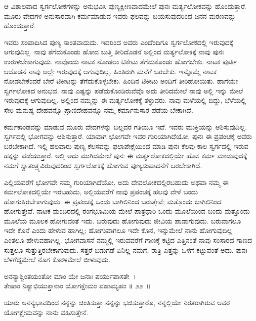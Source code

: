 \begin{artha}
ಆ ವಿಶಾಲವಾದ ಸ್ವರ್ಗಲೋಕಗಳನ್ನು ಅನುಭವಿಸಿ ಪುಣ್ಯಕ್ಷೀಣವಾದಮೇಲೆ ಪುನಃ ಮರ್ತ್ಯಲೋಕವನ್ನು ಹೊಂದುತ್ತಾರೆ. ಮೂರು ವೇದಗಳ ಅನುಸಾರವಾಗಿ ಕರ್ಮಮಾಡುವ ಇವರು ಫಲವನ್ನು ಬಯಸುವುದರಿಂದ ಜನನ ಮರಣವನ್ನು ಹೊಂದುತ್ತಾರೆ.
\end{artha}

ಇವರು ಸಂಪಾದಿಸಿದ ಪುಣ್ಯ ಸಾಂತವಾದುದು. ಇದರಿಂದ ಅವರು ಎಂದೆಂದಿಗೂ ಸ್ವರ್ಗ\-ಲೋಕದಲ್ಲಿ ಇರುವುದಕ್ಕೆ ಆಗುವುದಿಲ್ಲ. ನಾವು ತೆಗೆದುಕೊಂಡು ಹೋದ ಬುತ್ತಿ ತೀರಿದೊಡನೆ ಅಲ್ಲಿಂದ ಮರ್ತ್ಯಲೋಕಕ್ಕೆ ನಾವು ಪುನಃ ಉರುಳಬೇಕಾಗುವುದು. ನಾವೊಂದು ನಾಟಕ ನೋಡಲು ಟಿಕೇಟು ತೆಗೆದುಕೊಂಡು ಹೋಗಬೇಕು. ನಾಟಕ ಪೂರ್ತಿ ಆದೊಡನೆ ನಾವು ಅಲ್ಲೇ ಇರುವುದಕ್ಕೆ ಆಗುವುದಿಲ್ಲ. ಹಿಂತಿರುಗಿ ಮನೆಗೆ ಬರಬೇಕು. ಇನ್ನೊಮ್ಮೆ ನಾಟಕ ನೋಡಬೇಕೆಂದರೆ ಬೇರೆ ಟಿಕೀಟನ್ನು ತೆಗೆದುಕೊಳ್ಳಬೇಕು. ಹಿಂದಿನ ಟಿಕೀಟು ಅಂದಿಗೆ ತೀರಿಹೋಯಿತು. ಹಾಗೆಯೇ ಸ್ವರ್ಗಲೋಕದ ಅನುಭವ. ನಾವು ಎಷ್ಟನ್ನು ಪಡೆದುಕೊಂಡಿರುವೆವೊ ಅದು ತೀರಿದಮೇಲೆ ನಾವು ಅಲ್ಲಿ ಇನ್ನು ಮೇಲೆ ಇರುವುದಕ್ಕೆ ಆಗುವುದಿಲ್ಲ. ಅಲ್ಲಿಂದ ನಮ್ಮನ್ನು ಈ ಮರ್ತ್ಯಲೋಕಕ್ಕೆ ತಳ್ಳುವರು. ನಾವು ಮಳೆಯಲ್ಲಿ ಬಿದ್ದು, ಬೆಳೆಯಲ್ಲಿ ಸೇರಿ ಮನುಷ್ಯ ದೇಹವನ್ನೊ ಪ್ರಾಣಿದೇಹವನ್ನೊ ನಮ್ಮ ಕರ್ಮಾನುಸಾರ ಪಡೆಯ ಬೇಕಾಗಿದೆ.

ಕರ್ಮಕಾಂಡವನ್ನು ಮಾಡುವ ಮೂರು ವೇದಗಳನ್ನು ಬಲ್ಲವರ ಗತಿಯೂ ಇದೆ. ಇವರು ಮುಕ್ತಿಯನ್ನು ಆಶಿಸುವುದಿಲ್ಲ. ಸ್ವರ್ಗದಲ್ಲಿ ಭೋಗವನ್ನು ಆಶಿಸುತ್ತಾರೆ. ಯಾವಾಗ ಭೋಗವೇ ಇವರ ಗುರಿಯಾಗಿದೆಯೋ, ಪುನಃ ಈ ಪ್ರಪಂಚಕ್ಕೆ ಅವರು ಬರಬೇಕಾಗಿದೆ. ಇಲ್ಲಿ ಹಲವಾರು ಪುಣ್ಯ ಕೆಲಸವನ್ನು ಫಲಾಪೇಕ್ಷೆಯಿಂದ ಮಾಡಿ ಪುನಃ ಕೆಲವು ಕಾಲ ಸ್ವರ್ಗದಲ್ಲಿ ಇರುವ ಹಕ್ಕನ್ನು ಪಡೆಯುತ್ತಾರೆ. ಅಲ್ಲಿ ಅದು ಮುಗಿದಮೇಲೆ ಪುನಃ ಈ ಮರ್ತ್ಯಲೋಕದಲ್ಲಿಯೇ ಹೊಸ ಕರ್ಮ ಮಾಡುವುದಕ್ಕೆ ನಮಗೆ ಸ್ವಾತಂತ್ರ್ಯವಿರುವುದರಿಂದ ಸ್ವರ್ಗಲೋಕಕ್ಕೆ ಹೋಗುವ ಪುಣ್ಯಸಂಪಾದನೆಗೆ ಬರಬೇಕಾಗಿದೆ.

ಎಲ್ಲಿಯವರೆಗೆ ಭೋಗವೇ ನಮ್ಮ ಗುರಿಯಾಗಿದೆಯೋ, ಅದು ದೇವಲೋಕದಲ್ಲಿರಬಹುದು ಅಥವಾ ನಮ್ಮ ಈ ಕರ್ಮಲೋಕದಲ್ಲಿಯೇ ಇರಬಹುದು, ಅಲ್ಲಿಯವರೆಗೆ ನಾವು ಪ್ರಪಂಚಕ್ಕೆ ಹಲವು ವೇಳೆ ಬಂದು ಹೋಗುತ್ತಿರಬೇಕಾಗುವುದು. ಈ ಪ್ರಪಂಚಕ್ಕೆ ಒಂದು ಬಾಗಿಲಿನಿಂದ ಬರುತ್ತೇವೆ; ಮತ್ತೊಂದು ಬಾಗಿಲಿನಿಂದ ಹೋಗುತ್ತೇವೆ. ನಾಟಕ ಮಂದಿರದಲ್ಲಿ ರಂಗಭೂಮಿಯ ಮೇಲೆ ಪಾತ್ರಧಾರಿ ಒಂದು ಮೂಲೆಯಿಂದ ಬಂದು ಮತ್ತೊಂದು ಮೂಲೆಯ ಮೂಲಕ ಹೋಗುವಂತೆ ಇದು. ಬರುವುದು ಹೋಗುವುದು ಜೀವಿಯ ಪಾಡಾಗುವುದು. ಬರುವಾಗಲೂ ಇದೇ ಕೊನೆ ಎಂದು ಹೇಳುವ ಹಾಗಿಲ್ಲ; ಹೋಗುವಾಗಲೂ ಇದೇ ಕೊನೆ, ಇನ್ನುಮೇಲೆ ನಾನು ಹೋಗುವುದಿಲ್ಲ ಎಂತಲೂ ಹೇಳುವಹಾಗಿಲ್ಲ. ಭೋಗವಾಸನೆ ನಮ್ಮಲ್ಲಿ ಇರುವವರೆಗೆ ಗಾಣಕ್ಕೆ ಕಟ್ಟಿದ ಎತ್ತಿನಂತೆ ನಾವು ಸಂಸಾರದ ಗಾಣದ ಸುತ್ತಲೂ ಸುತ್ತುತ್ತಿರಬೇಕಾಗುವುದು. ಸತ್ತರೆ ಬಿಡುಗಡೆ ಏನಿಲ್ಲ ನಮಗೆ; ರಾತ್ರಿ ಎತ್ತನ್ನು ಒಳಗೆ ಕಟ್ಟುವಂತೆ ಅದು. ಪುನಃ ಬೆಳಗೆದ್ದಮೇಲೆ ನೊಗ ಕೊರಳಮೇಲೆ ಬೀಳುವುದು.

\begin{shloka}
ಅನನ್ಯಾಶ್ಚಿಂತಯಂತೋ ಮಾಂ ಯೇ ಜನಾಃ ಪರ್ಯುಪಾಸತೇ~।\\ತೇಷಾಂ ನಿತ್ಯಾಭಿಯುಕ್ತಾನಾಂ ಯೋಗಕ್ಷೇಮಂ ವಹಾಮ್ಯಹಂ \hfill॥ ೨೨~॥
\end{shloka}

\begin{artha}
ಯಾರು ಅನನ್ಯಭಾವದಿಂದ ನನ್ನನ್ನು ಚಿಂತಿಸುತ್ತಾ ನನ್ನನ್ನು ಭಜಿಸುತ್ತಾರೊ, ನನ್ನಲ್ಲಿಯೇ ನಿರತ\-ರಾಗಿರುವ ಅವರ ಯೋಗಕ್ಷೇಮವನ್ನು ನಾನು ವಹಿಸುತ್ತೇನೆ.
\end{artha}


